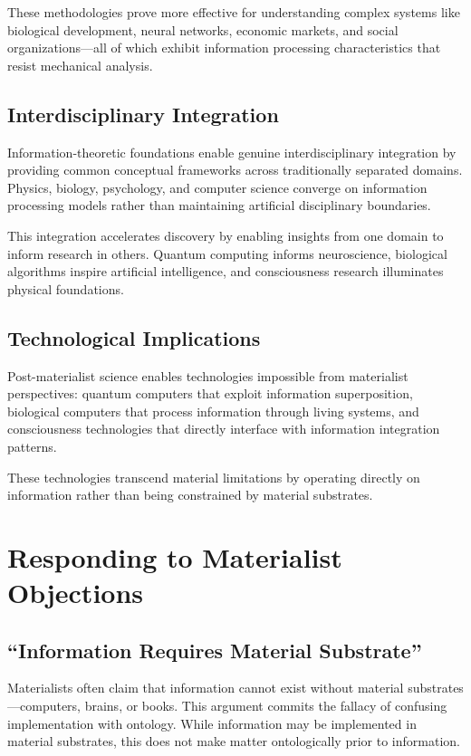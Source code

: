 \documentclass[12pt]{article}
\begin{document}
These methodologies prove more effective for understanding complex systems like biological development, neural networks, economic markets, and social organizations—all of which exhibit information processing characteristics that resist mechanical analysis.

\subsection{Interdisciplinary Integration}

Information-theoretic foundations enable genuine interdisciplinary integration by providing common conceptual frameworks across traditionally separated domains. Physics, biology, psychology, and computer science converge on information processing models rather than maintaining artificial disciplinary boundaries.

This integration accelerates discovery by enabling insights from one domain to inform research in others. Quantum computing informs neuroscience, biological algorithms inspire artificial intelligence, and consciousness research illuminates physical foundations.

\subsection{Technological Implications}

Post-materialist science enables technologies impossible from materialist perspectives: quantum computers that exploit information superposition, biological computers that process information through living systems, and consciousness technologies that directly interface with information integration patterns.

These technologies transcend material limitations by operating directly on information rather than being constrained by material substrates.

\section{Responding to Materialist Objections}

\subsection{``Information Requires Material Substrate''}

Materialists often claim that information cannot exist without material substrates—computers, brains, or books. This argument commits the fallacy of confusing implementation with ontology. While information may be implemented in material substrates, this does not make matter ontologically prior to information.
\end{document}
